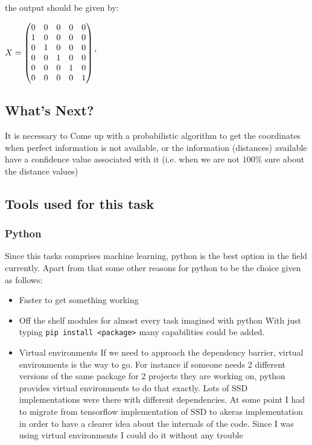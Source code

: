 the output should be given by:

$
X =
 \begin{pmatrix}
 0 & 0 & 0 & 0 & 0 \\
 1 & 0 & 0 & 0 & 0 \\
 0 & 1 & 0 & 0 & 0 \\
 0 & 0 & 1 & 0 & 0 \\
 0 & 0 & 0 & 1 & 0 \\
 0 & 0 & 0 & 0 & 1 \\
 \end{pmatrix}
`$


\subsection{What's Next?}
It is necessary to Come up  with a probabilistic algorithm to get the coordinates when perfect information is not available, or the information (distances) available have a confidence value associated with it (i.e. when we are not $100\%$ sure about the distance values)
\subsection{Tools used for this task}
\subsubsection{Python}
Since this tasks comprises machine learning, python is the best option in the field currently. Apart from that some other reasons for python to be the choice given as follows:

\begin{itemize}
\item Faster to get something working
\item Off the shelf modules for almost every task imagined with python
\subitem With just typing \texttt{pip install <package>} many capabilities could be added.
\item Virtual environments
\subitem If we need to approach the dependency barrier, virtual environments is the way to go. For instance if someone needs 2 different versions of the same package for 2 projects they are working on, python provides virtual environments to do that exactly.
\subitem Lots of SSD implementations were there with different dependencies. At some point I had to migrate from tensorflow implementation of SSD to akeras implementation in order to have a clearer  idea about the internals of the code. Since I was using virtual environments I could do it without any trouble
\end{itemize}

